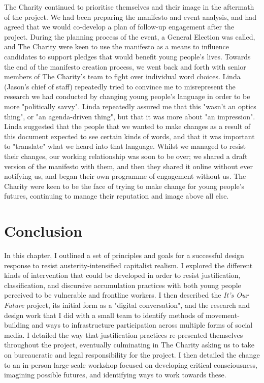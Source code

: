 The Charity continued to prioritise themselves and their image in the aftermath of the project. We had been preparing the manifesto and event analysis, and had agreed that we would co-develop a plan of follow-up engagement after the project. During the planning process of the event, a General Election was called, and The Charity were keen to use the manifesto as a means to influence candidates to support pledges that would benefit young people's lives. Towards the end of the manifesto creation process, we went back and forth with senior members of The Charity’s team to fight over individual word choices. Linda (Jason's chief of staff) repeatedly tried to convince me to misrepresent the research we had conducted by changing young people's language in order to be more "politically savvy". Linda repeatedly assured me that this "wasn't an optics thing", or "an agenda-driven thing", but that it was more about "an impression". Linda suggested that the people that we wanted to make changes as a result of this document expected to see certain kinds of words, and that it was important to "translate" what we heard into that language. Whilst we managed to resist their changes, our working relationship was soon to be over; we shared a draft version of the manifesto with them, and then they shared it online without ever notifying us, and began their own programme of engagement without us. The Charity were keen to be the face of trying to make change for young people's futures, continuing to manage their reputation and image above all else. 

\section{Conclusion}
In this chapter, I outlined a set of principles and goals for a successful design response to resist austerity-intensified capitalist realism. I explored the different kinds of intervention that could be developed in order to resist justification, classification, and discursive accumulation practices with both young people perceived to be vulnerable and frontline workers. I then described the \textit{It's Our Future} project, its initial form as a "digital conversation", and the research and design work that I did with a small team to identify methods of movement-building and ways to infrastructure participation across multiple forms of social media. I detailed the way that justification practices re-presented themselves throughout the project, eventually culminating in The Charity asking us to take on bureaucratic and legal responsibility for the project. I then detailed the change to an in-person large-scale workshop focused on developing critical consciousness, imagining possible futures, and identifying ways to work towards these.

